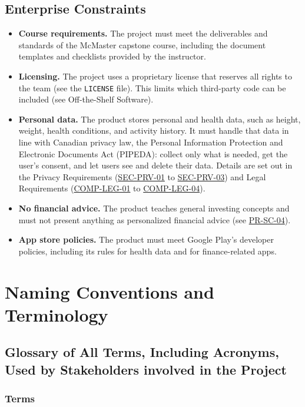 \documentclass[12pt]{article}
\newcommand{\acr}[3]{\phantomsection\label{acr:#1}#2 (#3)}
\begin{document}
\subsection{Enterprise Constraints}
\label{sec:enterprise}

\begin{itemize}
  \item \textbf{Course requirements.} The project must meet the deliverables
  and standards of the McMaster capstone course, including the document
  templates and checklists provided by the instructor.
  \item \textbf{Licensing.} The project uses a proprietary license that
  reserves all rights to the team (see the \texttt{LICENSE} file). This limits
  which third-party code can be included (see Off-the-Shelf Software).
  \item \textbf{Personal data.} The product stores personal and health data,
  such as height, weight, health conditions, and activity history. It must
  handle that data in line with Canadian privacy law, the \acr{PIPEDA}{Personal Information
  Protection and Electronic Documents Act}{PIPEDA}: collect only
  what is needed, get the user's consent, and let users see and delete their
  data. Details are set out in the Privacy Requirements (\hyperlink{req:SEC-PRV-01}{SEC-PRV-01} to
  \hyperlink{req:SEC-PRV-03}{SEC-PRV-03}) and Legal Requirements (\hyperlink{req:COMP-LEG-01}{COMP-LEG-01} to \hyperlink{req:COMP-LEG-04}{COMP-LEG-04}).
  \item \textbf{No financial advice.} The product teaches general investing
  concepts and must not present anything as personalized financial advice (see
  \hyperlink{req:PR-SC-04}{PR-SC-04}).
  \item \textbf{App store policies.} The product must meet Google Play's
  developer policies, including its rules for health data and for
  finance-related apps.
\end{itemize}

\section{Naming Conventions and Terminology}
\subsection{Glossary of All Terms, Including Acronyms, Used by Stakeholders
involved in the Project}
\label{sec:glossary}

\subsubsection{Terms}
\end{document}

